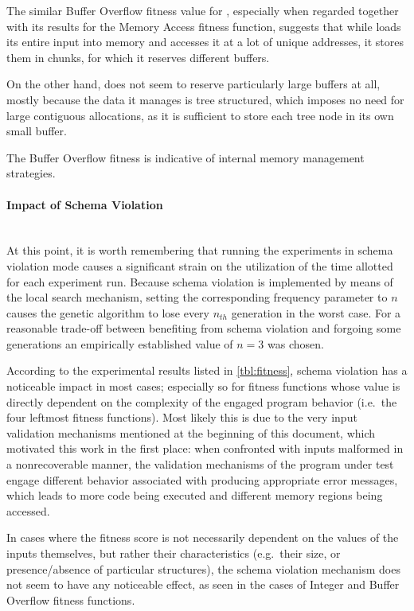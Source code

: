 The similar Buffer Overflow fitness value for \libpng, especially when regarded together with its results for
the Memory Access fitness function, suggests that while \libpng loads its entire input into memory and
accesses it at a lot of unique addresses, it stores them in chunks, for which it reserves different buffers.

On the other hand, \libxml does not seem to reserve particularly large buffers at all, mostly because the data
it manages is tree structured, which imposes no need for large contiguous allocations, as it is sufficient to
store each tree node in its own small buffer.

\begin{mdframed}
\centering
The Buffer Overflow fitness is indicative of internal memory management strategies.
\end{mdframed}

\paragraph{Impact of Schema Violation} ~\\
At this point, it is worth remembering that running the experiments in schema violation mode causes a
significant strain on the utilization of the time allotted for each experiment run. Because schema violation
is implemented by means of the local search mechanism, setting the corresponding frequency parameter to
$n$ causes the genetic algorithm to lose every $n_{th}$ generation in the worst case. For a
reasonable trade-off between benefiting from schema violation and forgoing some generations an empirically
established value of $n=3$ was chosen.

According to the experimental results listed in \cref{tbl:fitness}, schema violation has a noticeable impact in
most cases; especially so for fitness functions whose value is directly dependent on the complexity of the
engaged program behavior (i.e.\ the four leftmost fitness functions). Most likely this is due to the
very input validation mechanisms mentioned at the beginning of this document, which motivated this work in the
first place: when confronted with inputs malformed in a nonrecoverable manner, the validation mechanisms of the
program under test engage different behavior associated with producing appropriate error messages,
which leads to more code being executed and different memory regions being accessed.

In cases where the fitness score is not necessarily dependent on the values of the inputs themselves, but
rather their characteristics (e.g.\ their size, or presence/absence of particular structures), the schema
violation mechanism does not seem to have any noticeable effect, as seen in the cases of Integer and Buffer
Overflow fitness functions.

